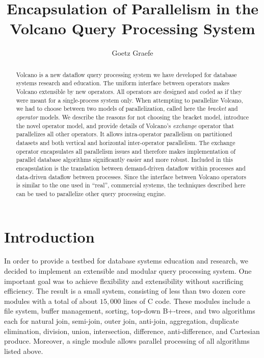\documentclass[a4paper,12pt,notitlepage,twoside,openright]{article}
\title{Encapsulation of Parallelism in the Volcano Query Processing System}
\author{Goetz Graefe}
\date{}
\begin{document}
\maketitle

\begin{abstract}
  Volcano is a new dataflow query processing system we have developed for database systems research and education.
  The uniform interface between operators makes Volcano extensible by new operators. All operators are designed and coded as
  if they were meant for a single-process system only. When attempting to parallelize Volcano, we had to choose between two
  models of parallelization, called here the \emph{bracket} and \emph{operator} models. We describe the reasons for not choosing the bracket
  model, introduce the novel operator model, and provide details of Volcano's \emph{exchange} operator that parallelizes all other operators.
  It allows intra-operator parallelism on partitioned datasets and both vertical and horizontal inter-operator parallelism. The
  exchange operator encapsulates all parallelism issues and therefore makes implementation of parallel database algorithms significantly
  easier and more robust. Included in this encapsulation is the translation between demand-driven dataflow within
  processes and data-driven dataflow between processes. Since the interface between Volcano operators is similar to the one
  used in ``real'', commercial systems, the techniques described here can be used to parallelize other query processing engine.
\end{abstract}

\section{Introduction}

In order to provide a testbed for database systems
education and research, we decided to implement an extensible
and modular query processing system. One important
goal was to achieve flexibility and extensibility without
sacrificing efficiency. The result is a small system, consisting
of less than two dozen core modules with a total of about
\(15,000\) lines of C code. These modules include a file system,
buffer management, sorting, top-down B+-trees, and
two algorithms each for natural join, semi-join, outer join,
anti-join, aggregation, duplicate elimination, division, union,
intersection, difference, anti-difference, and Cartesian produce.
Moreover, a single module allows parallel processing
of all algorithms listed above.
\end{document}
